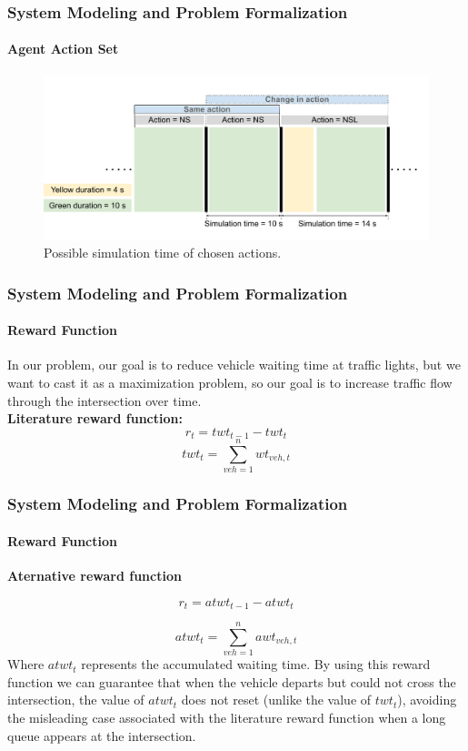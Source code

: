 \documentclass[aspectratio=169]{beamer}
\begin{document}
\begin{frame}
\frametitle{System Modeling and Problem Formalization}
\framesubtitle{Agent Action Set}

\begin{figure}
    \centering
    \includegraphics[width=0.8\linewidth]{images/Simulation steps.pdf}
    \caption{Possible simulation time of chosen actions.}
\end{figure}

\end{frame}
\begin{frame}
\frametitle{System Modeling and Problem Formalization}
\framesubtitle{Reward Function}
In our problem, our goal is to reduce vehicle waiting time at traffic lights, but we want to cast it as a maximization problem, so our goal is to increase traffic flow through the intersection over time. \\
\textbf{Literature reward function:}
\begin{equation}
\label{Eq:3}
    r_t= twt_{t-1} - twt_t
\end{equation}
\begin{equation}
\label{Eq:2}
    twt_t= \sum_{veh=1}^{n} {wt_{veh,t}}
\end{equation}


\end{frame}
\begin{frame}
\frametitle{System Modeling and Problem Formalization}
\framesubtitle{Reward Function}
\textbf{Aternative reward function}

\begin{equation}
\label{Eq:5}
    r_t= atwt_{t-1} - atwt_t
\end{equation}
    
\begin{equation}
\label{Eq:4}
    atwt_t= \sum_{veh=1}^{n} {awt_{veh,t}}
\end{equation}
 Where $atwt_t$ represents the accumulated waiting time. By using this reward function we can guarantee that when the vehicle departs but could not cross the intersection, the value of $atwt_t$ does not reset (unlike the value of $twt_t$), avoiding the misleading case associated with the literature reward function when a long queue appears at the intersection.
\end{frame}
\end{document}
